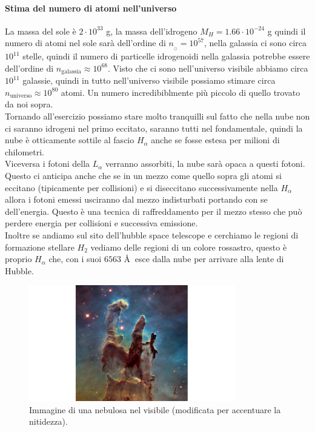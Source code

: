 \paragraph{Stima del numero di atomi nell'universo}%
La massa del sole è $2 \cdot 10^{33} $ g, la massa dell'idrogeno $M_{H} = 1.66 \cdot 10^{-24}$ g quindi il numero di atomi nel sole sarà dell'ordine di $n_{_{\odot}} = 10^{57}$, nella galassia ci sono circa $10^{11}$ stelle, quindi il numero di particelle idrogenoidi nella galassia potrebbe essere dell'ordine di $n_{\text{galassia}} \approx 10^{68}$. 
Visto che ci sono nell'universo visibile abbiamo circa $10^{11}$ galassie, quindi in tutto nell'universo visibile possiamo stimare circa $n_{\text{universo}} \approx 10^{80}$ atomi. 
Un numero incredibiblmente più piccolo di quello trovato da noi sopra.\\
Tornando all'esercizio possiamo stare molto tranquilli sul fatto che nella nube non ci saranno idrogeni nel primo eccitato, saranno tutti nel fondamentale, quindi la nube è otticamente sottile al fascio $H_{\alpha}$ anche se fosse estesa per milioni di chilometri.\\
Viceversa i fotoni della $L_{\alpha }$ verranno assorbiti, la nube sarà opaca a questi fotoni.\\
Questo ci anticipa anche che se in un mezzo come quello sopra gli atomi si eccitano (tipicamente per collisioni) e si diseccitano successivamente nella $H_{\alpha }$ allora i fotoni emessi usciranno dal mezzo indisturbati portando con se dell'energia. 
Questo è una tecnica di raffreddamento per il mezzo stesso che può perdere energia per collisioni e successiva emissione.\\
Inoltre se andiamo sul sito dell'hubble space telescope e cerchiamo le regioni di formazione stellare $H_2$ vediamo delle regioni di un colore rossastro, questo è proprio $H_{\alpha }$ che, con i suoi $6563$ \AA $ \ $  esce dalla nube per arrivare alla lente di Hubble.
\begin{figure}[H]
	\centering
	\includegraphics[width=0.8\textwidth]{figures/veil-nebula.png}
	\caption{\scriptsize Immagine di una nebulosa nel visibile (modificata per accentuare la nitidezza).}
	\label{fig:figures-veil-nebula-png}
\end{figure}
\noindent
